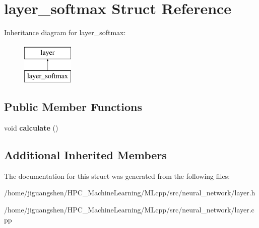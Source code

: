\hypertarget{structlayer__softmax}{\section{layer\-\_\-softmax Struct Reference}
\label{structlayer__softmax}
}
Inheritance diagram for layer\-\_\-softmax\-:\begin{figure}[H]
\begin{center}
\leavevmode
\includegraphics[height=2.000000cm]{structlayer__softmax}
\end{center}
\end{figure}
\subsection*{Public Member Functions}
\begin{DoxyCompactItemize}
\item 
\hypertarget{structlayer__softmax_addf2fcfd6b5c0131e2429f49835bf8e8}{void {\bfseries calculate} ()}\label{structlayer__softmax_addf2fcfd6b5c0131e2429f49835bf8e8}

\end{DoxyCompactItemize}
\subsection*{Additional Inherited Members}


The documentation for this struct was generated from the following files\-:\begin{DoxyCompactItemize}
\item 
/home/jiguangshen/\-H\-P\-C\-\_\-\-Machine\-Learning/\-M\-Lcpp/src/neural\-\_\-network/layer.\-h\item 
/home/jiguangshen/\-H\-P\-C\-\_\-\-Machine\-Learning/\-M\-Lcpp/src/neural\-\_\-network/layer.\-cpp\end{DoxyCompactItemize}
